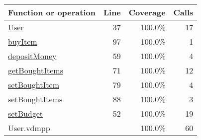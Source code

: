 \bigskip
\begin{longtable}{|l|r|r|r|}
\hline
Function or operation & Line & Coverage & Calls \\
\hline
\hline
\hyperref[User:37]{User} & 37&100.0\% & 17 \\
\hline
\hyperref[buyItem:97]{buyItem} & 97&100.0\% & 1 \\
\hline
\hyperref[depositMoney:59]{depositMoney} & 59&100.0\% & 4 \\
\hline
\hyperref[getBoughtItems:71]{getBoughtItems} & 71&100.0\% & 12 \\
\hline
\hyperref[setBoughtItem:79]{setBoughtItem} & 79&100.0\% & 4 \\
\hline
\hyperref[setBoughtItems:88]{setBoughtItems} & 88&100.0\% & 3 \\
\hline
\hyperref[setBudget:52]{setBudget} & 52&100.0\% & 19 \\
\hline
\hline
User.vdmpp & & 100.0\% & 60 \\
\hline
\end{longtable}

